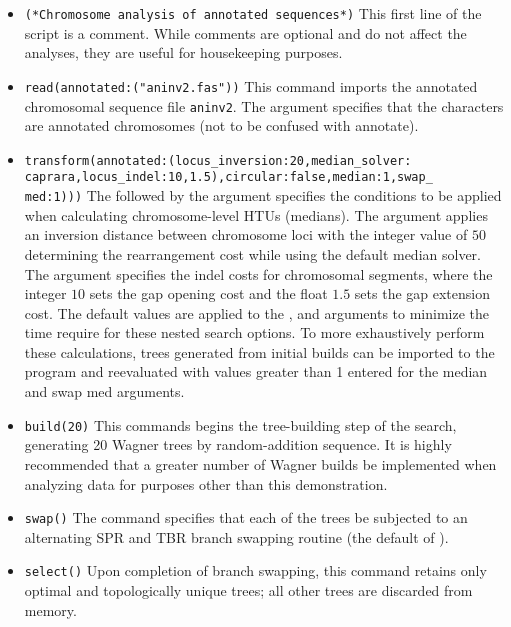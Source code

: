 \begin{itemize}
\item \texttt{(*Chromosome analysis of annotated sequences*)} This
first line of the script is a comment. While comments are optional
and do not affect the analyses, they are useful for housekeeping
purposes.  
\item \texttt{read(annotated:("aninv2.fas"))} This command
imports the annotated chromosomal sequence file \texttt{aninv2}.
The argument  specifies that the characters
are annotated chromosomes (not to be confused with \poyargument
{annotate}).  
\item \texttt{transform(annotated:(locus\_inversion:20,median\_solver:\\
caprara,locus\_indel:10,1.5),circular:false,median:1,swap\_\\
med:1)))} The  followed by the argument
 specifies the conditions to be applied when
calculating chromosome-level HTUs (medians). The argument
 applies an inversion distance between
chromosome loci with the integer value  of $50$ determining the
rearrangement cost while using the default 
median solver. The argument  specifies
the indel costs for chromosomal segments, where the integer $10$
sets the gap opening cost and the float $1.5$ sets the gap extension
cost. The default values are applied to the ,
 and  arguments to
minimize the time require for these nested search options. To more
exhaustively perform these calculations, trees generated from initial
builds can be imported to the program and reevaluated with values
greater than 1 entered for the median and swap med arguments.  
\item \texttt{build(20)} This commands begins the tree-building step of
the search, generating 20 Wagner trees by random-addition sequence.
It is highly recommended that a greater number of Wagner builds be
implemented when analyzing data for purposes other than this
demonstration.  
\item \texttt{swap()} The  command
specifies that each of the trees be subjected to an alternating SPR
and TBR branch swapping routine (the default of \poy).  
\item \texttt{select()} Upon completion of branch swapping, this command
retains only optimal and topologically unique trees; all other trees
are discarded from memory.  

\end{itemize}
